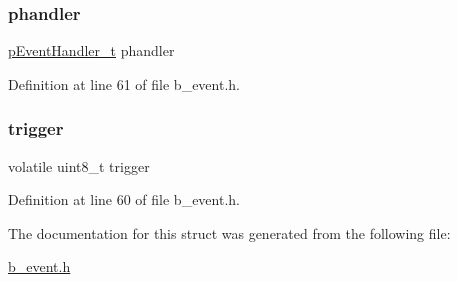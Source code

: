 \mbox{\label{structb_event_info__t_a9fbd366c3d5dee62ece2b2217959c27e}} 
\subsubsection{\texorpdfstring{phandler}{phandler}}
{\footnotesize\ttfamily \mbox{\hyperlink{group___e_v_e_n_t___exported___types_definitions_ga42b0d7ce13d1e439f8fe00eec38e90d1}{p\+Event\+Handler\+\_\+t}} phandler}



Definition at line 61 of file b\+\_\+event.\+h.

\mbox{\label{structb_event_info__t_aad577ce52c9a28d35802f282ee12246d}} 
\subsubsection{\texorpdfstring{trigger}{trigger}}
{\footnotesize\ttfamily volatile uint8\+\_\+t trigger}



Definition at line 60 of file b\+\_\+event.\+h.



The documentation for this struct was generated from the following file\+:\begin{DoxyCompactItemize}
\item 
\mbox{\hyperlink{b__event_8h}{b\+\_\+event.\+h}}\end{DoxyCompactItemize}
